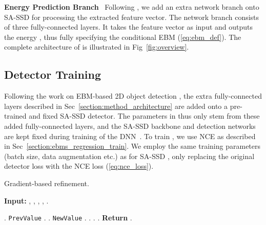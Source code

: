 \documentclass[letterpaper, 10 pt, conference]{ieeeconf}
\newcommand{\parsection}[1]{\vspace{2mm}\noindent\textbf{#1}~ }
\begin{document}
\parsection{Energy Prediction Branch}
Following \cite{gustafsson2019learning, danelljan2020probabilistic, gustafsson2020train}, we add an extra network branch onto SA-SSD for processing the extracted feature vector. The network branch consists of three fully-connected layers. It takes the feature vector  as input and outputs the energy , thus fully specifying the conditional EBM  (\ref{eq:ebm_def}). The complete architecture of  is illustrated in Fig~\ref{fig:overview}.

























\subsection{Detector Training}
\label{section:method_training}
Following the work on EBM-based 2D object detection \cite{gustafsson2019learning, gustafsson2020train}, the extra fully-connected layers described in Sec~\ref{section:method_architecture} are added onto a pre-trained and fixed SA-SSD detector. The parameters  in  thus only stem from these added fully-connected layers, and the SA-SSD backbone and detection networks are kept fixed during training of the DNN~. To train , we use NCE as described in Sec~\ref{section:ebms_regression_train}. We employ the same training parameters (batch size, data augmentation etc.) as for SA-SSD \cite{he2020structure}, only replacing the original detector loss with the NCE loss (\ref{eq:nce_loss}).




























\begin{algorithm}
\caption{Gradient-based refinement.}
\label{algo:prediction}
\textbf{Input:} , , , , .
\begin{algorithmic}[1]
    \For{\texttt{}}
        \State .
        \For{\texttt{}}
            \State \texttt{PrevValue}  .
            \State .
            \State \texttt{NewValue}  .
            \If { }
                \State .
            \Else
                \State .
            \EndIf
        \EndFor
        \State .
    \EndFor
    \State \textbf{Return} .
\end{algorithmic}
\end{algorithm}\vspace{-3mm}
\end{document}
